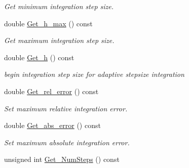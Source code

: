 \begin{DoxyCompactItemize}
\begin{DoxyCompactList}\small\item\em Get minimum integration step size. \end{DoxyCompactList}\item 
double \hyperlink{structcudanusquids_1_1ParameterObject_a3789507d91b59e44f7d39b6618792416}{Get\+\_\+h\+\_\+max} () const \hypertarget{structcudanusquids_1_1ParameterObject_a3789507d91b59e44f7d39b6618792416}{}\label{structcudanusquids_1_1ParameterObject_a3789507d91b59e44f7d39b6618792416}

\begin{DoxyCompactList}\small\item\em Get maximum integration step size. \end{DoxyCompactList}\item 
double \hyperlink{structcudanusquids_1_1ParameterObject_ae97af1e60608dda2dd03dc3ba804480b}{Get\+\_\+h} () const \hypertarget{structcudanusquids_1_1ParameterObject_ae97af1e60608dda2dd03dc3ba804480b}{}\label{structcudanusquids_1_1ParameterObject_ae97af1e60608dda2dd03dc3ba804480b}

\begin{DoxyCompactList}\small\item\em begin integration step size for adaptive stepsize integration \end{DoxyCompactList}\item 
double \hyperlink{structcudanusquids_1_1ParameterObject_a0f9d32bd04745236faa43c7099818ab9}{Get\+\_\+rel\+\_\+error} () const \hypertarget{structcudanusquids_1_1ParameterObject_a0f9d32bd04745236faa43c7099818ab9}{}\label{structcudanusquids_1_1ParameterObject_a0f9d32bd04745236faa43c7099818ab9}

\begin{DoxyCompactList}\small\item\em Set maximum relative integration error. \end{DoxyCompactList}\item 
double \hyperlink{structcudanusquids_1_1ParameterObject_a0f668b060796141c7d47db0c2cc7aefb}{Get\+\_\+abs\+\_\+error} () const \hypertarget{structcudanusquids_1_1ParameterObject_a0f668b060796141c7d47db0c2cc7aefb}{}\label{structcudanusquids_1_1ParameterObject_a0f668b060796141c7d47db0c2cc7aefb}

\begin{DoxyCompactList}\small\item\em Set maximum absolute integration error. \end{DoxyCompactList}\item 
unsigned int \hyperlink{structcudanusquids_1_1ParameterObject_adc040f2980caf65a452fbc7934a1a650}{Get\+\_\+\+Num\+Steps} () const \hypertarget{structcudanusquids_1_1ParameterObject_adc040f2980caf65a452fbc7934a1a650}{}\label{structcudanusquids_1_1ParameterObject_adc040f2980caf65a452fbc7934a1a650}


\end{DoxyCompactItemize}
